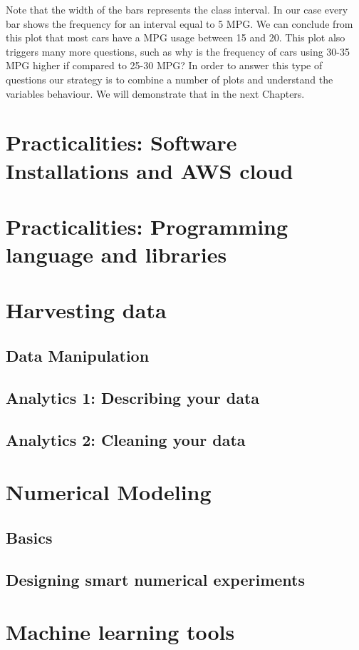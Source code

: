\documentclass[10pt]{PhDthesisPSnPDF}%
\begin{document}
\newpage

Note that the width of the bars represents the class interval. In our case every bar shows the frequency for an interval equal to 5 MPG. We can conclude from this plot that most cars have a MPG usage between 15 and 20. This plot also triggers many more questions, such as why is the frequency of cars using 30-35 MPG higher if compared to 25-30 MPG? In order to answer this type of questions our strategy is to combine a number of plots and understand the variables behaviour. We will demonstrate that in the next Chapters.

\chapter{Practicalities: Software Installations and AWS cloud}\label{P1}
\chapter{Practicalities: Programming language and libraries}\label{P2}
\chapter{Harvesting data}\label{harvesting}
\section{Data Manipulation}\label{dataM} 
\section{Analytics 1: Describing your data}\label{Analy.1}
\section{Analytics 2: Cleaning your data}\label{Analy.2}
\chapter{Numerical Modeling}\label{numerics}
\section{Basics}\label{numBasics}
\section{Designing smart numerical experiments}\label{NumDesign}
\chapter{Machine learning tools}\label{MLearn}
\end{document}
